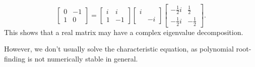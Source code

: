 \documentclass[../main/main.tex]{subfiles}
\begin{document}
\begin{example}
\[	\begin{bmatrix} 0&-1\\1&0 \end{bmatrix} =\begin{bmatrix} i&i\\1&-1 \end{bmatrix} \begin{bmatrix} i&\\&-i \end{bmatrix} \begin{bmatrix} -\frac{1}{2}i&\frac{1}{2}\\-\frac{1}{2}i&-\frac{1}{2} \end{bmatrix} 
	.\] This shows that a real matrix may have a complex eigenvalue decomposition.
\end{example}
\begin{remark}
However, we don't usually solve the characteristic equation, as polynomial root-finding is not numerically stable in general.
	
\end{remark}
\end{document}
